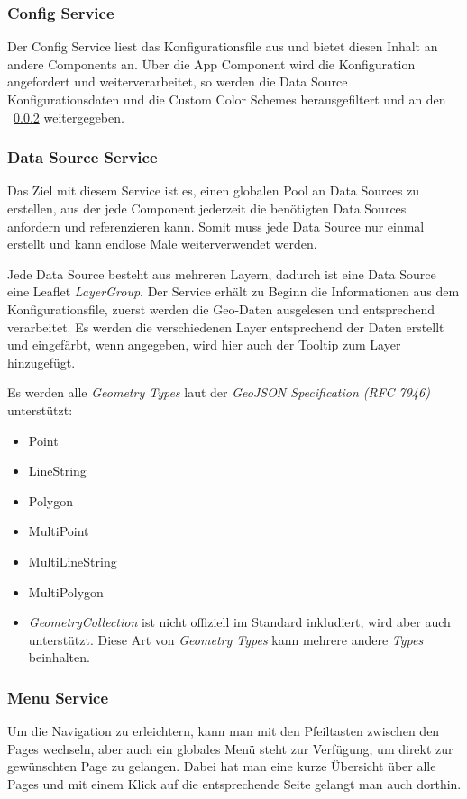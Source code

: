 \subsubsection{Config Service}
Der Config Service liest das Konfigurationsfile aus und bietet diesen Inhalt an andere Components an.
Über die App Component wird die Konfiguration angefordert und weiterverarbeitet, so werden die Data Source Konfigurationsdaten
und die Custom Color Schemes herausgefiltert und an den ~\ref{subsubsec:data-source-service} weitergegeben.

\subsubsection{Data Source Service}
\label{subsubsec:data-source-service}
Das Ziel mit diesem Service ist es, einen globalen Pool an Data Sources zu erstellen, aus der jede Component jederzeit die
benötigten Data Sources anfordern und referenzieren kann.
Somit muss jede Data Source nur einmal erstellt und kann endlose Male weiterverwendet werden.

Jede Data Source besteht aus mehreren Layern, dadurch ist eine Data Source eine Leaflet \emph{LayerGroup}.
Der Service erhält zu Beginn die Informationen aus dem Konfigurationsfile, zuerst werden die Geo-Daten ausgelesen und entsprechend verarbeitet.
Es werden die verschiedenen Layer entsprechend der Daten erstellt und eingefärbt, wenn angegeben, wird hier auch der Tooltip zum Layer hinzugefügt.

Es werden alle \emph{Geometry Types} laut der \emph{GeoJSON Specification (RFC 7946)}~\cite{rfc7946} unterstützt:

\begin{itemize}
    \item Point
    \item LineString
    \item Polygon
    \item MultiPoint
    \item MultiLineString
    \item MultiPolygon
    \item \emph{GeometryCollection} ist nicht offiziell im Standard inkludiert, wird aber auch unterstützt.
    Diese Art von \emph{Geometry Types} kann mehrere andere \emph{Types} beinhalten.
\end{itemize}

\subsubsection{Menu Service}
Um die Navigation zu erleichtern, kann man mit den Pfeiltasten zwischen den Pages wechseln, aber auch ein globales Menü
steht zur Verfügung, um direkt zur gewünschten Page zu gelangen.
Dabei hat man eine kurze Übersicht über alle Pages und mit einem Klick auf die entsprechende Seite gelangt man auch dorthin.

